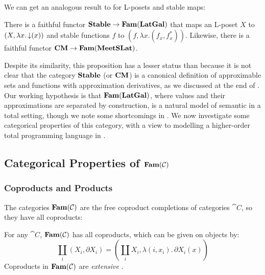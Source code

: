 We can get an analogous result to  for
L-posets and stable maps:

\begin{proposition}
  \label{prop:embed-stable}
  There is a faithful functor $\mathbf{Stable} \to \mathbf{Fam}(\mathbf{LatGal})$ that maps an
  L-poset $X$ to $(X, \lambda x. \mathop{\downarrow}(x))$ and stable functions
  $f$ to $(f, \lambda x. (f_x, f^*_x))$. Likewise, there is a faithful
  functor $\mathbf{CM} \to \mathbf{Fam}(\mathbf{MeetSLat})$.
\end{proposition}

Despite its similarity, this proposition has a lesser status than
 because it is not clear that the category
$\mathbf{Stable}$ (or $\mathbf{CM}$) is a canonical definition of approximable sets
and functions with approximation derivatives, as we discussed at the
end of .
Our working hypothesis is that $\mathbf{Fam}(\mathbf{LatGal})$, where values and their
approximations are separated by construction, is a natural model of
semantic \GPS in a total setting, though we note some shortcomings in
. We now investigate some categorical
properties of this category, with a view to modelling a higher-order
total programming language in .

\subsection{Categorical Properties of $\mathbf{Fam}(\mathcal{C})$}

\subsubsection{Coproducts and Products}
\label{sec:models-of-total-gps:coproducts-and-products}

The categories $\mathbf{Fam}(\mathcal{C})$ are the free coproduct completions of
categories $\cat{C}$, so they have all coproducts:

\begin{proposition}
  For any $\cat{C}$, $\mathbf{Fam}(\mathcal{C})$ has all coproducts, which can be
  given on objects by:
  \begin{displaymath}
    \coprod_i (X_i, \partial X_i) = (\coprod_i X_i, \lambda (i, x_i).\, \partial X_i(x))
  \end{displaymath}
  Coproducts in $\mathbf{Fam}(\mathcal{C})$ are \emph{extensive}
  \cite[Proposition 2.4]{carboni-lack-walters93}.
\end{proposition}

